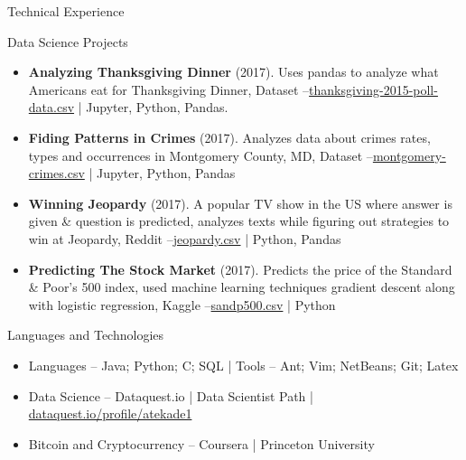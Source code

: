 \documentclass[]{mcdowellcv}
\begin{document}
	\begin{cvsection}{Technical Experience}
		\begin{cvsubsection}{Data Science Projects}{}{}
			\begin{itemize}
				\item \textbf{Analyzing Thanksgiving Dinner} (2017). Uses pandas to analyze what Americans eat for Thanksgiving Dinner, Dataset --\href{https://fivethirtyeight.com/features/heres-what-your-part-of-america-eats-on-thanksgiving/}{thanksgiving-2015-poll-data.csv} | Jupyter, Python, Pandas.
				\item \textbf{Fiding Patterns in Crimes} (2017). Analyzes data about crimes rates, types and occurrences in Montgomery County, MD, Dataset --\href{https://data.montgomerycountymd.gov/Public-Safety/Crime/icn6-v9z3}{montgomery-crimes.csv} | Jupyter, Python, Pandas
				\item\textbf{Winning Jeopardy} (2017). A popular TV show in the US where answer is given \& question is predicted, analyzes texts while figuring out strategies to win at Jeopardy, Reddit --\href{https://www.reddit.com/r/datasets/comments/1uyd0t/200000_jeopardy_questions_in_a_json_file/}{jeopardy.csv} | Python, Pandas
				\item\textbf{Predicting The Stock Market} (2017). Predicts the price of the Standard \& Poor's 500 index, used machine learning techniques gradient descent along with logistic regression, Kaggle --\href{https://www.kaggle.com/camnugent/sandp500}{sandp500.csv} | Python
			\end{itemize}
		\end{cvsubsection}
	\end{cvsection}
	\begin{cvsection}{Languages and Technologies}
		\begin{cvsubsection}{}{}{}	
			\begin{itemize}
				\item Languages -- Java; Python; C; SQL | Tools -- Ant; Vim; NetBeans; Git; Latex
				\item Data Science -- Dataquest.io | Data Scientist Path | \href{https://www.dataquest.io/profile/atekade1}{dataquest.io/profile/atekade1}
				\item Bitcoin and Cryptocurrency -- Coursera | Princeton University
			\end{itemize}
		\end{cvsubsection}
	\end{cvsection}
\end{document}
